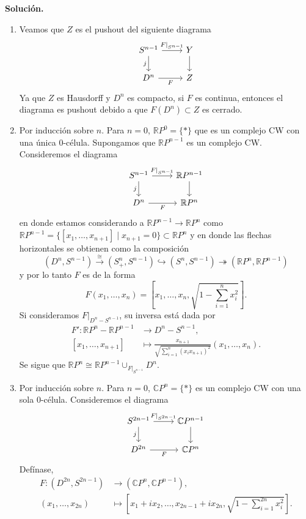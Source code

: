 \documentclass[11pt,a4paper]{article}
\theoremstyle{plain}
\theoremstyle{definition}
\theoremstyle{remark}
\newcommand{\RR}{\mathbb R}
\newcommand{\CC}{\mathbb C}
\begin{document}
\begin{enumerate}[label=\arabic*.,leftmargin=*]
\noindent\textbf{Solución.}
\begin{enumerate}[label=\alph*)]
\item Veamos que $Z$ es el pushout del siguiente diagrama
\[
\begin{tikzcd}
S^{n-1} \arrow[r,"F|_{S^{n-1}}"] \arrow[d,swap,"j"] & Y \arrow[d] \\
D^n \arrow[r,swap,"F"] & Z
\end{tikzcd}
\]
Ya que $Z$ es Hausdorff y $D^n$ es compacto, si $F$ es continua, entonces
el diagrama es pushout debido a que $F(D^n)\subset Z$ es cerrado.
\item Por inducción sobre $n$. Para $n=0$, $\RR P^0=\{*\}$ que es un
complejo CW con una única $0$-célula. Supongamos que $\RR P^{n-1}$ es un
complejo CW. Consideremos el diagrama
\[
\begin{tikzcd}
S^{n-1} \arrow[r,"F|_{S^{n-1}}"] \arrow[d,swap,"j"] & \RR P^{n-1} \arrow[d] \\
D^n \arrow[r,swap,"F"] & \RR P^n
\end{tikzcd}
\]
en donde estamos considerando a $\RR P^{n-1}\to\RR P^n$ como
$\RR P^{n-1}=\{[x_1,\dots,x_{n+1}]\mid x_{n+1}=0\}\subset\RR P^n$ y en
donde las flechas horizontales se obtienen como la composición
\[
(D^n,S^{n-1})\overset{\cong}{\to}(S^n_+,S^{n-1})\hookrightarrow(S^n,S^{n-1})\twoheadrightarrow(\RR P^n,\RR P^{n-1})
\]
y por lo tanto $F$ es de la forma
\[
F(x_1,\dots,x_n)=\left[x_1,\dots,x_n,\sqrt{1-\sum_{i=1}^nx_i^2}\right].
\]
Si consideramos $F|_{D^n-S^{n-1}}$, su inversa está dada por
\[
\begin{aligned}
F':\RR P^n-\RR P^{n-1}&\to D^n-S^{n-1}, \\
[x_1,\dots,x_{n+1}]&\mapsto\frac{x_{n+1}}{\sqrt{\sum_{i=1}^n(x_ix_{n+1})^2}}(x_1,\dots,x_n).
\end{aligned}
\]
Se sigue que $\RR P^n\cong\RR P^{n-1}\cup_{F|_{S^{n-1}}}D^n$.
\item Por inducción sobre $n$. Para $n=0$, $\CC P^n=\{*\}$ es un complejo
CW con una sola $0$-célula. Consideremos el diagrama
\[
\begin{tikzcd}
S^{2n-1} \arrow[r,"F|_{S^{2n-1}}"] \arrow[d,swap,"j"] & \CC P^{n-1} \arrow[d] \\
D^{2n} \arrow[r,swap,"F"] & \CC P^n
\end{tikzcd}
\]
Defínase,
\[
\begin{aligned}
F:(D^{2n},S^{2n-1})&\to(\CC P^n,\CC P^{n-1}), \\
(x_1,\dots,x_{2n})&\mapsto\left[x_1+ix_2,\dots,x_{2n-1}+ix_{2n},\sqrt{1-\sum_{i=1}^{2n}x_i^2}\right].

\end{aligned}\]
\end{enumerate}
\end{enumerate}
\end{document}
